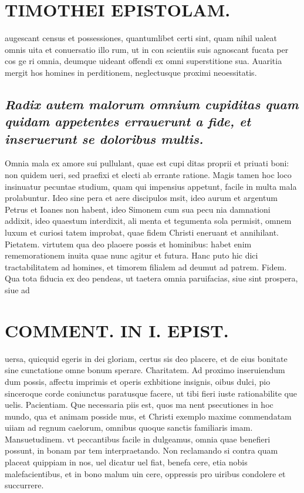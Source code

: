\documentclass{article}
\begin{document}
\begin{pages}
\section*{TIMOTHEI EPISTOLAM. }
\marginpar{[ p.169 ]}\pstart augescant census et possessiones, quantumlibet certi sint, quam nihil ualeat omnis uita et conuersatio illo rum, ut in con scientiis suis agnoscant fucata per cos ge ri omnia, deumque uideant offendi ex omni superstitione sua. Auaritia mergit hos homines in perditionem, neglectusque proximi neoessitatis.  \pend
{}
{}
\subsection*{\textit{Radix autem malorum omnium cupiditas quam quidam appetentes errauerunt a fide, et inseruerunt se doloribus multis. }}\pstart Omnia mala ex amore sui pullulant, quae est cupi ditas proprii et priuati boni: non quidem ueri, sed praefixi et electi ab errante ratione. Magis tamen hoc loco insinuatur pecuntae studium, quam qui impensius appetunt, facile in multa mala prolabuntur. Ideo sine pera et aere discipulos msit, ideo aurum et argentum Petrus et Ioanes non habent, ideo Simonem cum sua pecu nia damnationi addixit, ideo quaestum interdixit, ali menta et tegumenta sola permisit, omnem luxum et curiosi tatem improbat, quae fidem Christi eneruant et annihilant.  \pend\pstart Pietatem. virtutem qua deo plaoere possis et hominibus: habet enim rememorationem inuita quae nunc agitur et futura. Hanc puto hic dici tractabilitatem ad homines, et timorem filialem ad deumut ad patrem.  \pend\pstart Fidem. Qua tota fiducia ex deo pendeas, ut taetera omnia paruifacias, siue sint prospera, siue ad  \pend
\section*{COMMENT. IN I. EPIST. }
\marginpar{[ p.170 ]}\pstart uersa, quicquid egeris in dei gloriam, certus sis deo placere, et de eius bonitate sine cunctatione omne bonum sperare.  \pend\pstart Charitatem. Ad proximo inseruiendum dum possis, affectu imprimis et operis exhbitione insignis, oibus dulci, pio sinceroque corde coniunctus paratusque facere, ut tibi fieri iuste rationabilite que uelis.  \pend\pstart Pacientiam. Que necessaria piis est, quos ma nent psecutiones in hoc mundo, qua et animam posside mus, et Christi exemplo maxime commendatam uiiam ad regnum caelorum, omnibus quoque sanctis familiaris imam.  \pend\pstart Mansuetudinem. vt peccantibus facile in dulgeamus, omnia quae benefieri possunt, in bonam par tem interpraetando. Non reclamando si contra quam placeat quippiam in nos, uel dicatur uel fiat, benefa cere, etia nobis malefacientibus, et in bono malum uin cere, oppressis pro uiribus condolere et succurrere.  \pend
{}
{}

\end{pages}
\end{document}
